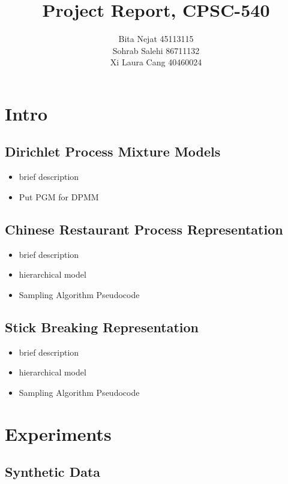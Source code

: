 \documentclass{article}
\title{Project Report, CPSC-540}
\author{
Bita Nejat 45113115 \\
Sohrab Salehi 86711132 \\
Xi Laura Cang 40460024
}
\begin{document}
\maketitle

\section{Intro}

\subsection{Dirichlet Process Mixture Models}

\begin{itemize}
	\item brief description
	\item Put PGM for DPMM
\end{itemize}

\subsection{Chinese Restaurant Process Representation}
\begin{itemize}
	\item brief description
	\item hierarchical model
	\item Sampling Algorithm Pseudocode \cite{neal2000markov}
\end{itemize}

\subsection{Stick Breaking Representation}

\begin{itemize}
	\item brief description
	\item hierarchical model
	\item Sampling Algorithm Pseudocode
\end{itemize}

\section{Experiments}

\subsection{Synthetic Data}
\end{document}
